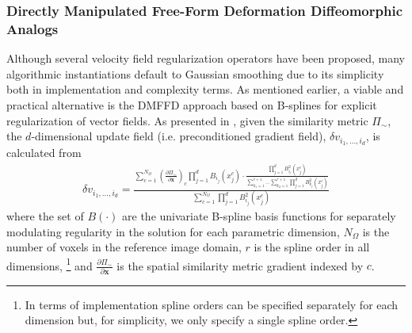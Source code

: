 \documentclass{frontiersSCNS}
\begin{document}
\subsubsection{Directly Manipulated Free-Form Deformation Diffeomorphic Analogs}

Although several velocity field regularization
operators have been proposed, many algorithmic instantiations
default to Gaussian smoothing due to its simplicity both in implementation
and complexity terms.  As mentioned earlier, 
a viable and practical alternative is the DMFFD 
approach based on B-splines for explicit regularization of vector fields.
As presented in \cite{tustison2009}, given the similarity metric
$\Pi_{\sim}$, the $d$-dimensional update field (i.e. preconditioned
gradient field), $\delta v_{i_1,\ldots,i_d}$, is calculated from
\begin{align}
\label{eq:dmffd}
  \delta v_{i_1,\ldots,i_d} = \frac{ \sum_{c=1}^{N_{\Omega}} \left( \frac{\partial \Pi_\sim}{\partial \mathbf{x}} \right)_c \prod_{j=1}^d B_{i_j}(x_j^c)  
  \cdot \frac{\prod_{j=1}^d B_{i_j}^2 (x_j^c)}
  {\sum_{k_1=1}^{r+1}\ldots\sum_{k_d=1}^{r+1} 
  \prod_{j=1}^d B_{k_j}^2 (x_j^c)} }
  {\sum_{c=1}^{N_{\Omega}} \prod_{j=1}^d B_{i_j}^2 (x_j^c)}
\end{align}
where the set of $B(\cdot)$ are the univariate B-spline basis functions for
separately modulating regularity in the solution for each parametric dimension,
$N_\Omega$ is the number of voxels in the reference image domain,
$r$ is the spline order in all dimensions,%
\footnote{
In terms of implementation spline orders can be specified separately for each dimension but, for simplicity,
we only specify a single spline order.
}
and $\frac{\partial \Pi_\sim}{\partial \mathbf{x}}$ is the spatial 
similarity metric gradient indexed by $c$.
\end{document}

